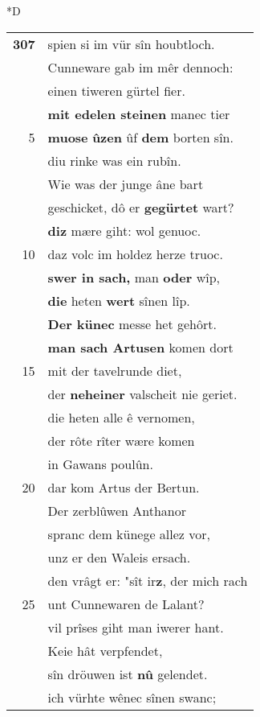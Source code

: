 \documentclass[8pt,a4paper,notitlepage]{article}
\begin{document}
\begin{table}[ht]
\begin{minipage}[t]{0.5\linewidth}
\small
\begin{center}*D
\end{center}
\begin{tabular}{rl}
\textbf{307} & spien si im vür sîn houbtloch.\\ 
 & Cunneware gab im mêr dennoch:\\ 
 & einen tiweren gürtel fier.\\ 
 & \textbf{mit edelen steinen} manec tier\\ 
5 & \textbf{muose} \textbf{ûzen} ûf \textbf{dem} borten sîn.\\ 
 & diu rinke was ein rubîn.\\ 
 & Wie was der junge âne bart\\ 
 & geschicket, dô er \textbf{gegürtet} wart?\\ 
 & \textbf{diz} mære giht: wol genuoc.\\ 
10 & daz volc im holdez herze truoc.\\ 
 & \textbf{swer in sach,} man \textbf{oder} wîp,\\ 
 & \textbf{die} heten \textbf{wert} sînen lîp.\\ 
 & \textbf{Der künec} messe het gehôrt.\\ 
 & \textbf{man sach Artusen} komen dort\\ 
15 & mit der tavelrunde diet,\\ 
 & der \textbf{neheiner} valscheit nie geriet.\\ 
 & die heten alle ê vernomen,\\ 
 & der rôte rîter wære komen\\ 
 & in Gawans poulûn.\\ 
20 & dar kom Artus der Bertun.\\ 
 & Der zerblûwen Anthanor\\ 
 & spranc dem künege allez vor,\\ 
 & unz er den Waleis ersach.\\ 
 & den vrâgt er: "sît ir\textbf{z}, der mich rach\\ 
25 & unt Cunnewaren de Lalant?\\ 
 & vil prîses giht man iwerer hant.\\ 
 & Keie hât verpfendet,\\ 
 & sîn dröuwen ist \textbf{nû} gelendet.\\ 
 & ich vürhte wênec sînen swanc;\\ 

\end{tabular}
\end{minipage}
\end{table}
\end{document}

